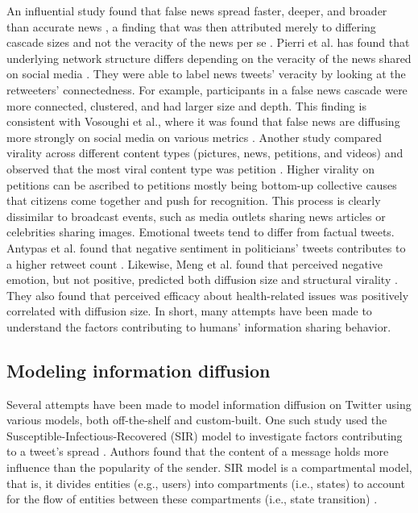 \documentclass[11pt,a4paper]{article}
\begin{document}
    An influential study found that false news spread faster, deeper, and broader than accurate news \cite{vosoughi_spread_2018}, a finding that was then attributed merely to differing cascade sizes and not the veracity of the news per se \cite{juul_comparing_2021}. Pierri et al. has found that underlying network structure differs depending on the veracity of the news shared on social media \cite{pierri_topology_2020}. They were able to label news tweets' veracity by looking at the retweeters' connectedness. For example, participants in a false news cascade were more connected, clustered, and had larger size and depth. This finding is consistent with Vosoughi et al., where it was found that false news are diffusing more strongly on social media on various metrics \cite{vosoughi_spread_2018}. Another study compared virality across different content types (pictures, news, petitions, and videos) and observed that the most viral content type was petition \cite{goel_structural_2016}. Higher virality on petitions can be ascribed to petitions mostly being bottom-up collective causes that citizens come together and push for recognition. This process is clearly dissimilar to broadcast events, such as media outlets sharing news articles or celebrities sharing images. Emotional tweets tend to differ from factual tweets. Antypas et al. found that negative sentiment in politicians' tweets contributes to a higher retweet count \cite{antypas_negativity_2023}. Likewise, Meng et al. found that perceived negative emotion, but not positive, predicted both diffusion size and structural virality \cite{meng_diffusion_2018}. They also found that perceived efficacy about health-related issues was positively correlated with diffusion size. In short, many attempts have been made to understand the factors contributing to humans' information sharing behavior.
    
    \subsection{Modeling information diffusion}
    Several attempts have been made to model information diffusion on Twitter using various models, both off-the-shelf and custom-built. One such study used the Susceptible-Infectious-Recovered (SIR) model to investigate factors contributing to a tweet's spread \cite{zheng_factors_2018}. Authors found that the content of a message holds more influence than the popularity of the sender. SIR model is a compartmental model, that is, it divides entities (e.g., users) into compartments (i.e., states) to account for the flow of entities between these compartments (i.e., state transition) \cite{kermack_contribution_1927}.
    
\end{document}
